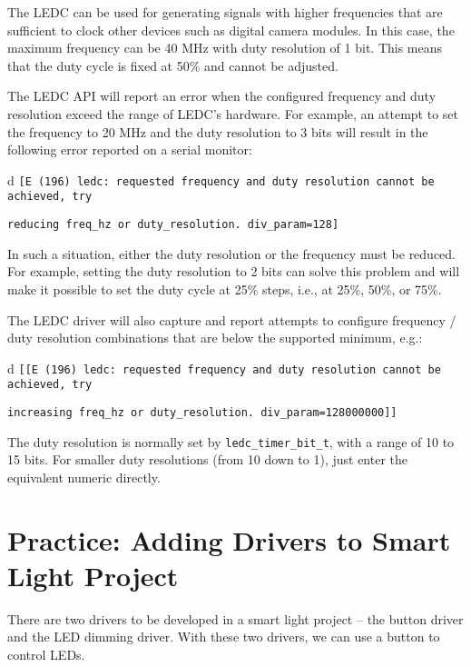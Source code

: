 \documentclass[a4paper,12pt]{book}
\begin{document}
The LEDC can be used for generating signals with higher frequencies that are sufficient to clock other devices such as digital camera modules. In this case, the maximum frequency can be 40 MHz with duty resolution of 1 bit. This means that the duty cycle is fixed at 50\% and cannot be adjusted.

The LEDC API will report an error when the configured frequency and duty resolution exceed the range of LEDC’s hardware. For example, an attempt to set the frequency to 20 MHz and the duty resolution to 3 bits will result in the following error reported on a serial monitor:

\begin{codebloc}
\begin{tabular}{d}
\verb|[E (196) ledc: requested frequency and duty resolution cannot be achieved, try |

\verb|reducing freq_hz or duty_resolution. div_param=128]|
\end{tabular}  
\end{codebloc}

In such a situation, either the duty resolution or the frequency must be reduced. For example, setting the duty resolution to 2 bits can solve this problem and will make it possible to set the duty cycle at 25\% steps, i.e., at 25\%, 50\%, or 75\%.

The LEDC driver will also capture and report attempts to configure frequency / duty resolution combinations that are below the supported minimum, e.g.:

\begin{codebloc}
\begin{tabular}{d}
\verb|[[E (196) ledc: requested frequency and duty resolution cannot be achieved, try |

\verb|increasing freq_hz or duty_resolution. div_param=128000000]]|
\end{tabular}  
\end{codebloc}

The duty resolution is normally set by \verb|ledc_timer_bit_t|, with a range of 10 to 15 bits. For smaller duty resolutions (from 10 down to 1), just enter the equivalent numeric directly.

\section{Practice: Adding Drivers to Smart Light Project}
There are two drivers to be developed in a smart light project – the button driver and the LED dimming driver. With these two drivers, we can use a button to control LEDs.
\end{document}
